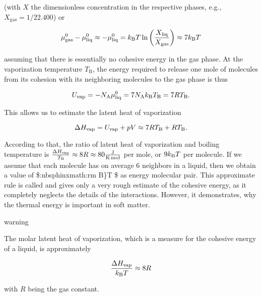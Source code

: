 \documentclass[letterpaper,10pt,english]{sphinxmanual}
\begin{document}
\sphinxAtStartPar
(with \(X\) the dimensionless concentration in the respective phases, e.g., \(X_\mathrm{gas}=1/22.400\)) or

\sphinxAtStartPar
\begin{equation}
\mu^{0}_{\rm gas}-\mu^0_{\rm liq}\approx -\mu^{0}_{\rm liq}=k_{\rm B}T \ln\left (\frac{X_{\rm liq}}{X_{\rm gas}}\right)\approx 7 k_{\rm B}T
\end{equation}

\sphinxAtStartPar
assuming that there is essentially no cohesive energy in the gas phase. At the vaporization temperature \(T_\mathrm{B}\), the energy required to release one mole of molecules from its cohesion with its neighboring molecules to the gas phase is thus

\sphinxAtStartPar
\begin{equation}
U_{\rm vap}=-N_{\rm A}\mu^0_{\rm liq}=7N_{\rm A}k_{\rm B}T_\mathrm{B}=7RT_\mathrm{B}.
\end{equation}

\sphinxAtStartPar
This allows us to estimate the latent heat of vaporization

\sphinxAtStartPar
\begin{equation}
\Delta H_{\rm vap}=U_{\rm vap}+pV\approx 7 R T_\mathrm{B}+RT_\mathrm{B}.
\end{equation}

\sphinxAtStartPar
According to that, the ratio of latent heat of vaporization and boiling temperature is \(\frac{\Delta H_{\rm vap}}{T_\mathrm{B}}\approx 8 R\approx 80 \frac{\rm J}{\rm K\, mol}\) per mole, or \(9 k_{\rm B} T\) per molecule. If we assume that each molecule has on average 6 neighbors in a liquid, then we obtain a value of \$:nbsphinx\sphinxhyphen{}math:rm B\textasciigrave{}\}T \$ as energy molecular pair. This approximate rule is called  and gives only a very rough
estimate of the cohesive energy, as it completely neglects the details of the interactions. However, it demonstrates, why the thermal energy is important in soft matter.

\begin{sphinxadmonition}{warning}{}\unskip
\sphinxAtStartPar
{}

\sphinxAtStartPar
The molar latent heat of vaporization, which is a measure for the cohesive energy of a liquid, is approximately

\sphinxAtStartPar
\begin{equation}
\frac{\Delta H_{\rm vap}}{k_\mathrm{B}T}\approx 8R
\end{equation}

\sphinxAtStartPar
with \(R\) being the gas constant.
\end{sphinxadmonition}
\end{document}
